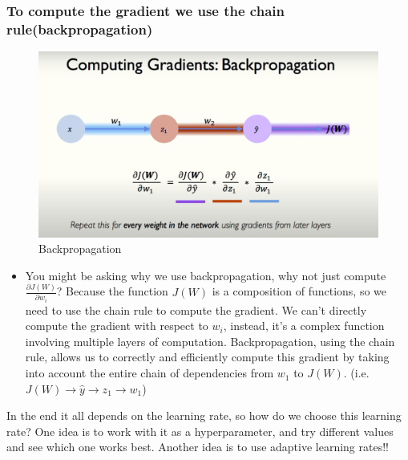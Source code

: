 \documentclass{article}
\begin{document}
\subsubsection*{To compute the gradient we use the chain rule(backpropagation)}
\begin{figure}[H]
  \centering
  \includegraphics[width = \textwidth]{Images/backprop.png}
  \caption{Backpropagation}
\end{figure} 
\begin{itemize}
  \item You might be asking why we use backpropagation, why not just compute \(\frac{\partial J(W)}{\partial w_i}\)? Because the function $J(W)$ is a composition of functions, so we need to use the chain rule to compute the gradient. We can't directly compute the gradient with respect to $w_i$, instead, it's a complex function involving multiple layers of computation. Backpropagation, using the chain rule, allows us to correctly and efficiently compute this gradient by taking into account the entire chain of dependencies from $w_1$ to $J(W)$. (i.e. $J(W) \rightarrow \hat{y} \rightarrow z_1 \rightarrow w_1$)
\end{itemize}
In the end it all depends on the learning rate, so how do we choose this learning rate? One idea is to work with it as a hyperparameter, and try different values and see which one works best. Another idea is to use adaptive learning rates!!
\end{document}
